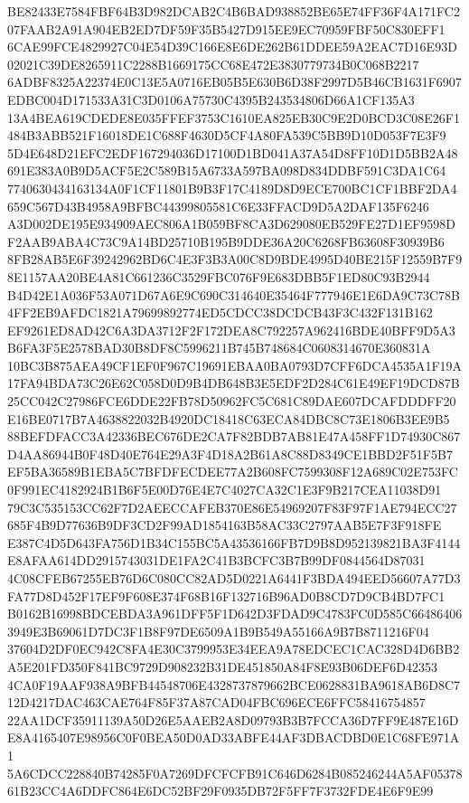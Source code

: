 \documentclass[UTF8,fontset=fandol,zihao=-4,a4paper]{ctexart}
\begin{document}
{{BE82433E7584FBF64B3D982DCAB2C4B6BAD938852BE65E74FF36F4A171FC207FAAB2A91A904EB2ED7DF59F35B5427D915EE9EC70959FBF50C830EFF1
6CAE99FCE4829927C04E54D39C166E8E6DE262B61DDEE59A2EAC7D16E93D02021C39DE8265911C2288B1669175CC68E472E3830779734B0C068B2217
6ADBF8325A22374E0C13E5A0716EB05B5E630B6D38F2997D5B46CB1631F6907EDBC004D171533A31C3D0106A75730C4395B243534806D66A1CF135A3
13A4BEA619CDEDE8E035FFEF3753C1610EA825EB30C9E2D0BCD3C08E26F1484B3ABB521F16018DE1C688F4630D5CF4A80FA539C5BB9D10D053F7E3F9
5D4E648D21EFC2EDF167294036D17100D1BD041A37A54D8FF10D1D5BB2A48691E383A0B9D5ACF5E2C589B15A6733A597BA098D834DDBF591C3DA1C64
7740630434163134A0F1CF11801B9B3F17C4189D8D9ECE700BC1CF1BBF2DA4659C567D43B4958A9BFBC44399805581C6E33FFACD9D5A2DAF135F6246
A3D002DE195E934909AEC806A1B059BF8CA3D629080EB529FE27D1EF9598DF2AAB9ABA4C73C9A14BD25710B195B9DDE36A20C6268FB63608F30939B6
8FB28AB5E6F39242962BD6C4E3F3B3A00C8D9BDE4995D40BE215F12559B7F98E1157AA20BE4A81C661236C3529FBC076F9E683DBB5F1ED80C93B2944
B4D42E1A036F53A071D67A6E9C690C314640E35464F777946E1E6DA9C73C78B4FF2EB9AFDC1821A79699892774ED5CDCC38DCDCB43F3C432F131B162
EF9261ED8AD42C6A3DA3712F2F172DEA8C792257A962416BDE40BFF9D5A3B6FA3F5E2578BAD30B8DF8C5996211B745B748684C0608314670E360831A
10BC3B875AEA49CF1EF0F967C19691EBAA0BA0793D7CFF6DCA4535A1F19A17FA94BDA73C26E62C058D0D9B4DB648B3E5EDF2D284C61E49EF19DCD87B
25CC042C27986FCE6DDE22FB78D50962FC5C681C89DAE607DCAFDDDFF20E16BE0717B7A4638822032B4920DC18418C63ECA84DBC8C73E1806B3EE9B5
88BEFDFACC3A42336BEC676DE2CA7F82BDB7AB81E47A458FF1D74930C867D4AA86944B0F48D40E764E29A3F4D18A2B61A8C88D8349CE1BBD2F51F5B7
EF5BA36589B1EBA5C7BFDFECDEE77A2B608FC7599308F12A689C02E753FC0F991EC4182924B1B6F5E00D76E4E7C4027CA32C1E3F9B217CEA11038D91
79C3C535153CC62F7D2AEECCAFEB370E86E54969207F83F97F1AE794ECC27685F4B9D77636B9DF3CD2F99AD1854163B58AC33C2797AAB5E7F3F918FE
E387C4D5D643FA756D1B34C155BC5A43536166FB7D9B8D952139821BA3F4144E8AFAA614DD2915743031DE1FA2C41B3BCFC3B7B99DF0844564D87031
4C08CFEB67255EB76D6C080CC82AD5D0221A6441F3BDA494EED56607A77D3FA77D8D452F17EF9F608E374F68B16F132716B96AD0B8CD7D9CB4BD7FC1
B0162B16998BDCEBDA3A961DFF5F1D642D3FDAD9C4783FC0D585C664864063949E3B69061D7DC3F1B8F97DE6509A1B9B549A55166A9B7B8711216F04
37604D2DF0EC942C8FA4E30C3799953E34EEA9A78EDCEC1CAC328D4D6BB2A5E201FD350F841BC9729D908232B31DE451850A84F8E93B06DEF6D42353
4CA0F19AAF938A9BFB44548706E4328737879662BCE0628831BA9618AB6D8C712D4217DAC463CAE764F85F37A87CAD04FBC696ECE6FFC58416754857
22AA1DCF35911139A50D26E5AAEB2A8D09793B3B7FCCA36D7FF9E487E16DE8A4165407E98956C0F0BEA50D0AD33ABFE44AF3DBACDBD0E1C68FE971A1
5A6CDCC228840B74285F0A7269DFCFCFB91C646D6284B085246244A5AF0537861B23CC4A6DDFC864E6DC52BF29F0935DB72F5FF7F3732FDE4E6F9E99
}}
\end{document}

